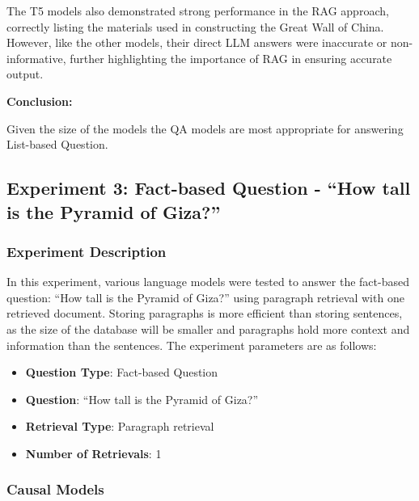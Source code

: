 \documentclass{wseas}
\begin{document}
The T5 models also demonstrated strong performance in the RAG approach,
correctly listing the materials used in constructing the Great Wall of
China. However, like the other models, their direct LLM answers were
inaccurate or non-informative, further highlighting the importance of
RAG in ensuring accurate output.

\textbf{Conclusion:}

Given the size of the models the QA models are most appropriate for
answering List-based Question.


\subsection{Experiment 3: Fact-based Question - ``How tall is the
Pyramid of
Giza?''}

\subsubsection{Experiment Description}

In this experiment, various language models were tested to answer the
fact-based question: ``How tall is the Pyramid of Giza?'' using
paragraph retrieval with one retrieved document. Storing paragraphs is
more efficient than storing sentences, as the size of the database will
be smaller and paragraphs hold more context and information than the
sentences. The experiment parameters are as follows:

\begin{itemize}
\item
  \textbf{Question Type}: Fact-based Question
\item
  \textbf{Question}: ``How tall is the Pyramid of Giza?''
\item
  \textbf{Retrieval Type}: Paragraph retrieval
\item
  \textbf{Number of Retrievals}: 1
\end{itemize}

\subsubsection{Causal Models}
\end{document}
